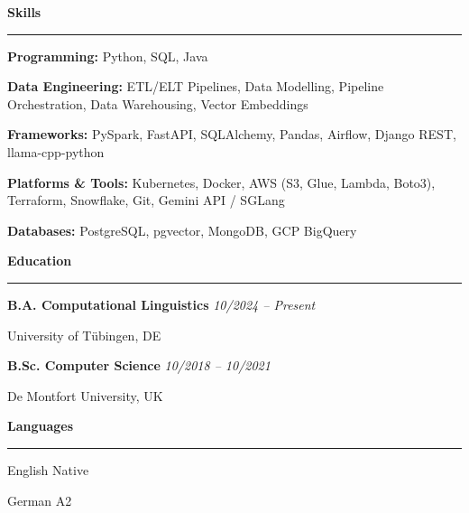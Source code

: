 \documentclass[11pt,a4paper]{article}
\newcommand{\cvsec}[1]{%
  \vspace{8pt}%
  {\large\bfseries\color{accent} #1}\par
  \vspace{3pt}%
  {\color{accent}\rule{\linewidth}{0.9pt}}\par
  \vspace{4pt}%
}
\begin{document}
\vfill

\cvsec{Skills}
{\small
\textbf{\color{accent}Programming:} Python, SQL, Java\par
\vspace{2pt}
\textbf{\color{accent}Data Engineering:} ETL/ELT Pipelines, Data Modelling, Pipeline Orchestration, Data Warehousing, Vector Embeddings\par
\vspace{2pt}
\textbf{\color{accent}Frameworks:} PySpark, FastAPI, SQLAlchemy, Pandas, Airflow, Django REST, llama-cpp-python\par
\vspace{2pt}
\textbf{\color{accent}Platforms \& Tools:} Kubernetes, Docker, AWS (S3, Glue, Lambda, Boto3), Terraform, Snowflake, Git, Gemini API / SGLang\par
\vspace{2pt}
\textbf{\color{accent}Databases:} PostgreSQL, pgvector, MongoDB, GCP BigQuery
}

\vfill

\cvsec{Education}
{\small
\textbf{B.A. Computational Linguistics} \hfill \textit{10/2024 -- Present}\par
{\color{mid}University of T\"{u}bingen, DE}\par
\vspace{4pt}
\textbf{B.Sc. Computer Science} \hfill \textit{10/2018 -- 10/2021}\par
{\color{mid}De Montfort University, UK}
}

\vfill

\cvsec{Languages}
{\small
English \hfill Native\par
\vspace{2pt}
German \hfill A2
}
\end{document}

